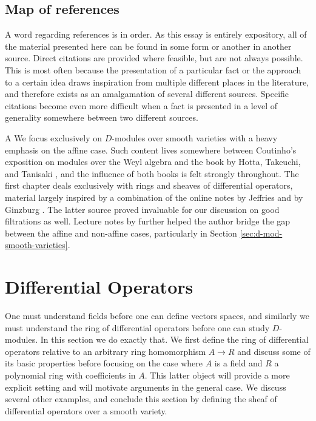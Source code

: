 \bigskip

\subsection*{Map of references}
\noindent A word regarding references is in order. As this essay is entirely expository, all of the material presented here can be found in some form or another in another source. Direct citations are provided where feasible, but are not always possible. This is most often because the presentation of a particular fact or the approach to a certain idea draws inspiration from multiple different places in the literature, and therefore exists as an amalgamation of several different sources. Specific citations become even more difficult when a fact is presented in a level of generality somewhere between two different sources. 

A We focus exclusively on $D$-modules over smooth varieties with a heavy emphasis on the affine case. Such content lives somewhere between Coutinho's exposition on modules over the Weyl algebra \cite{d-mod-primer} and the book by Hotta, Takeuchi, and Tanisaki \cite{d-mod_ps-rt}, and the influence of both books is felt strongly throughout. The first chapter deals exclusively with rings and sheaves of differential operators, material largely inspired by a combination of the online notes by Jeffries \cite{jeffries_d-mod} and by Ginzburg \cite{ginzburg_d-mod}. The latter source proved invaluable for our discussion on good filtrations as well. Lecture notes by \cite{cschnell} further helped the author bridge the gap between the affine and non-affine cases, particularly in Section \ref{sec:d-mod-smooth-varieties}.

\newpage
\section{Differential Operators}
One must understand fields before one can define vectors spaces, and similarly we must understand the ring of differential operators before one can study $D$-modules. In this section we do exactly that. We first define the ring of differential operators relative to an arbitrary ring homomorphism $A\to R$ and discuss some of its basic properties before focusing on the case where $A$ is a field and $R$ a polynomial ring with coefficients in $A$. This latter object will provide a more explicit setting and will motivate arguments in the general case. We discuss several other examples, and conclude this section by defining the sheaf of differential operators over a smooth variety.

